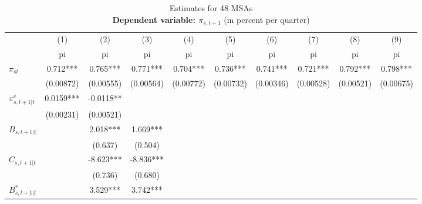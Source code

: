 \begin{table}[htbp]\centering
\def\sym#1{\ifmmode^{#1}\else\(^{#1}\)\fi}
\caption{Estimates for 48 MSAs \\ {\bf  Dependent variable: $\pi_{s,t+1}$} (in percent per quarter)}
\begin{tabular}{l*{9}{c}}
\toprule
                    &\multicolumn{1}{c}{(1)}&\multicolumn{1}{c}{(2)}&\multicolumn{1}{c}{(3)}&\multicolumn{1}{c}{(4)}&\multicolumn{1}{c}{(5)}&\multicolumn{1}{c}{(6)}&\multicolumn{1}{c}{(7)}&\multicolumn{1}{c}{(8)}&\multicolumn{1}{c}{(9)}\\
                    &\multicolumn{1}{c}{pi}&\multicolumn{1}{c}{pi}&\multicolumn{1}{c}{pi}&\multicolumn{1}{c}{pi}&\multicolumn{1}{c}{pi}&\multicolumn{1}{c}{pi}&\multicolumn{1}{c}{pi}&\multicolumn{1}{c}{pi}&\multicolumn{1}{c}{pi}\\
\midrule
$\pi_{st}$          &       0.712***&       0.765***&       0.771***&       0.704***&       0.736***&       0.741***&       0.721***&       0.792***&       0.798***\\
                    &   (0.00872)   &   (0.00555)   &   (0.00564)   &   (0.00772)   &   (0.00732)   &   (0.00346)   &   (0.00528)   &   (0.00521)   &   (0.00675)   \\
\addlinespace
$\pi^e_{s,t+1|t}$   &      0.0159***&     -0.0118** &               &               &               &               &               &               &               \\
                    &   (0.00231)   &   (0.00521)   &               &               &               &               &               &               &               \\
\addlinespace
$B_{s,t+1|t}$       &               &       2.018***&       1.669***&               &               &               &               &               &               \\
                    &               &     (0.637)   &     (0.504)   &               &               &               &               &               &               \\
\addlinespace
$C_{s,t+1|t}$       &               &      -8.623***&      -8.836***&               &               &               &               &               &               \\
                    &               &     (0.736)   &     (0.680)   &               &               &               &               &               &               \\
\addlinespace
$B^*_{s,t+1|t}$     &               &       3.529***&       3.742***&               &               &               &               &               &               \\

\end{tabular}
\end{table}
